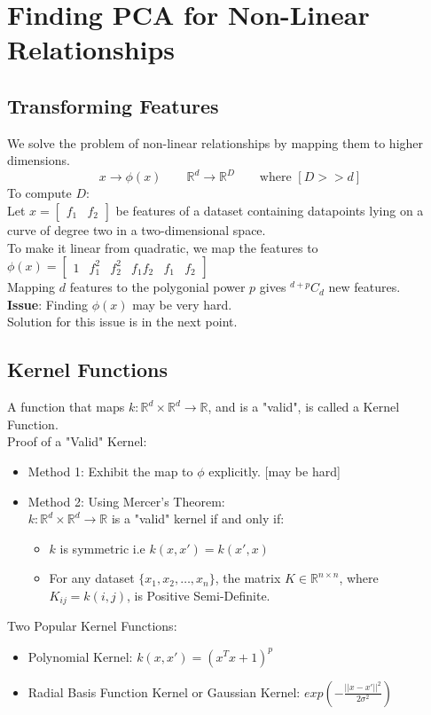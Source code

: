 \documentclass[letterpaper,11pt]{article}
\begin{document}
\section{Finding PCA for Non-Linear Relationships}

\subsection{Transforming Features}
We solve the problem of non-linear relationships by mapping them to higher dimensions. \\
$$
x \to \phi(x) \hspace{2em} \mathbb{R} ^d \to \mathbb{R} ^D \hspace{2em} \text{where } [D >> d]
$$
To compute $D$: \\
Let $x=\left [
\begin{array} {cc}
    f_1 & f_2
\end{array}
\right ]$ be features of a dataset containing datapoints lying on a curve of degree two in a two-dimensional space. \\
To make it linear from quadratic, we map the features to 
$\phi(x)=\left [
\begin{array} {cccccc}
    1 & f_1^2 & f_2^2 & f_1f_2 & f_1 & f_2
\end{array}
\right ]$\\
Mapping $d$ features to the polygonial power $p$ gives $^{d+p} C_d$ new features.\\\textbf{Issue}: Finding $\phi(x)$ may be very hard. \\
Solution for this issue is in the next point.\\
\subsection{Kernel Functions}
A function that maps $k: \mathbb{R}^d \times \mathbb{R}^d \to \mathbb{R}$, and is a "valid", is called a Kernel Function.\\
Proof of a "Valid" Kernel:
\begin{itemize}
    \item Method 1: Exhibit the map to $\phi$ explicitly. [may be hard]
    \item Method 2: Using Mercer's Theorem:\\
    \subitem $k: \mathbb{R}^d \times \mathbb{R}^d \to \mathbb{R}$ is a "valid" kernel if and only if:
    \begin{itemize}
        \item $k$ is symmetric i.e $k(x,x') = k(x',x)$
        \item For any dataset $\{x_1,x_2,\ldots,x_n  \}$, the matrix $K \in \mathbb{R}^{n \times n}$, where $K_{ij} = k(i,j)$, is Positive Semi-Definite.
    \end{itemize}
\end{itemize}
Two Popular Kernel Functions:
\begin{itemize}
    \item Polynomial Kernel: $k(x,x') = (x^Tx + 1)^p$
    \item Radial Basis Function Kernel or Gaussian Kernel: $exp(-\frac{||x-x'||^2}{2\sigma^2})$
\end{itemize}
\end{document}
